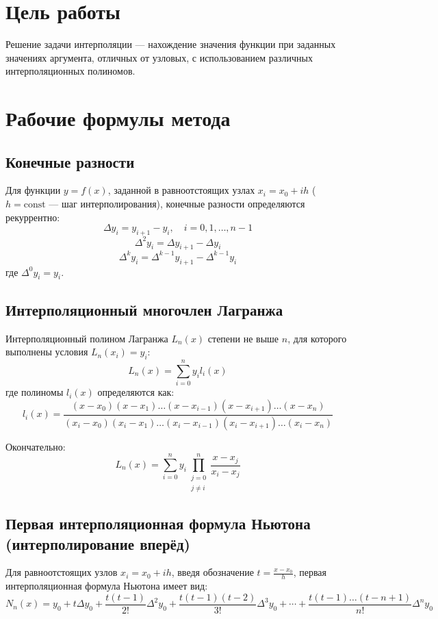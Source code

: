 \section{Цель работы}

Решение задачи интерполяции — нахождение значения функции при заданных значениях аргумента, отличных от узловых, с использованием различных интерполяционных полиномов.

\section{Рабочие формулы метода}

\subsection{Конечные разности}

Для функции $y = f(x)$, заданной в равноотстоящих узлах $x_i = x_0 + ih$ ($h = \text{const}$ — шаг интерполирования), конечные разности определяются рекуррентно:
\[
\Delta y_i = y_{i+1} - y_i,\quad i = 0, 1, \dots, n-1
\]
\[
\Delta^2 y_i = \Delta y_{i+1} - \Delta y_i
\]
\[
\Delta^k y_i = \Delta^{k-1} y_{i+1} - \Delta^{k-1} y_i
\]
где $\Delta^0 y_i = y_i$.

\subsection{Интерполяционный многочлен Лагранжа}

Интерполяционный полином Лагранжа $L_n(x)$ степени не выше $n$, для которого выполнены условия $L_n(x_i) = y_i$:
\[
L_n(x) = \sum_{i=0}^{n} y_i l_i(x)
\]
где полиномы $l_i(x)$ определяются как:
\[
l_i(x) = \frac{(x - x_0)(x - x_1)\ldots(x - x_{i-1})(x - x_{i+1})\ldots(x - x_n)}{(x_i - x_0)(x_i - x_1)\ldots(x_i - x_{i-1})(x_i - x_{i+1})\ldots(x_i - x_n)}
\]

Окончательно:
\[
L_n(x) = \sum_{i=0}^{n} y_i \prod_{\substack{j=0 \\ j \neq i}}^{n} \frac{x - x_j}{x_i - x_j}
\]

\subsection{Первая интерполяционная формула Ньютона (интерполирование вперёд)}

Для равноотстоящих узлов $x_i = x_0 + ih$, введя обозначение $t = \frac{x - x_0}{h}$, первая интерполяционная формула Ньютона имеет вид:
\[
N_n(x) = y_0 + t\Delta y_0 + \frac{t(t-1)}{2!}\Delta^2 y_0 + \frac{t(t-1)(t-2)}{3!}\Delta^3 y_0 + \cdots + \frac{t(t-1)\ldots(t-n+1)}{n!}\Delta^n y_0
\]

